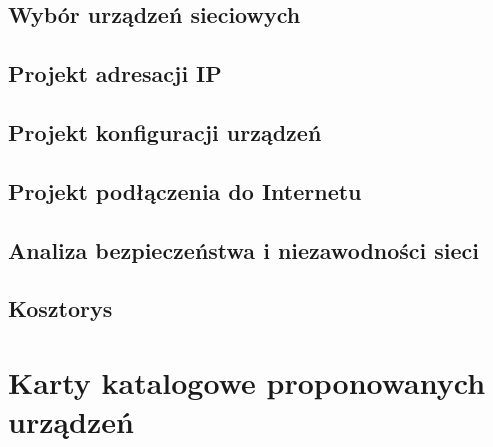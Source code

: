 \documentclass[12pt,a4paper]{article}
\begin{document}
\subsection{Wybór urządzeń sieciowych}

\subsection{Projekt adresacji IP}

\subsection{Projekt konfiguracji urządzeń}

\subsection{Projekt podłączenia do Internetu}

\subsection{Analiza bezpieczeństwa i niezawodności sieci}

\subsection{Kosztorys}

\section{Karty katalogowe proponowanych urządzeń}
\end{document}
